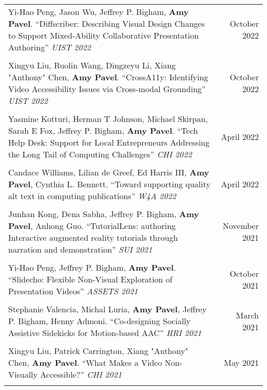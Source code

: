 \begin{longtable}{Xr}
	Yi-Hao Peng, Jason Wu, Jeffrey P. Bigham, \textbf{Amy Pavel}. ``Diffscriber: Describing Visual Design Changes to Support Mixed-Ability Collaborative Presentation Authoring'' \textit{UIST 2022} & October 2022 \\
	\\

	Xingyu Liu, Ruolin Wang, Dingzeyu Li, Xiang "Anthony" Chen, \textbf{Amy Pavel}. ``CrossA11y: Identifying Video Accessibility Issues via Cross-modal Grounding'' \textit{UIST 2022} & October 2022 \\
	\\

	Yasmine Kotturi, Herman T Johnson, Michael Skirpan, Sarah E Fox, Jeffrey P. Bigham, \textbf{Amy Pavel}. ``Tech Help Desk: Support for Local Entrepreneurs Addressing the Long Tail of Computing Challenges'' \textit{CHI 2022} & April 2022 \\
	\\

	Candace Williams, Lilian de Greef, Ed Harris III, \textbf{Amy Pavel}, Cynthia L. Bennett. ``Toward supporting quality alt text in computing publications'' \textit{W4A 2022} & April 2022 \\
	\\

	Junhan Kong, Dena Sabha, Jeffrey P. Bigham, \textbf{Amy Pavel}, Anhong Guo. ``TutorialLens: authoring Interactive augmented reality tutorials through narration and demonstration'' \textit{SUI 2021} & November 2021 \\
	\\

	Yi-Hao Peng, Jeffrey P. Bigham, \textbf{Amy Pavel}. ``Slidecho: Flexible Non-Visual Exploration of Presentation Videos'' \textit{ASSETS 2021} & October 2021 \\
	\\

	Stephanie Valencia, Michal Luria, \textbf{Amy Pavel}, Jeffrey P. Bigham, Henny Admoni. ``Co-designing Socially Assistive Sidekicks for Motion-based AAC'' \textit{HRI 2021} & March 2021 \\
	\\

	Xingyu Liu, Patrick Carrington, Xiang "Anthony" Chen, \textbf{Amy Pavel}. ``What Makes a Video Non-Visually Accessible?'' \textit{CHI 2021} & May 2021 \\
	\\


\end{longtable}

